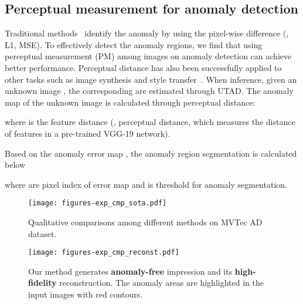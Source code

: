 \documentclass[final]{cvpr}
\newcommand{\proposed}{UTAD}
\begin{document}
\subsection{Perceptual measurement for anomaly detection} \label{sec:PM}

Traditional methods~\cite{A:akccay2019skip,A:schlegl2019fastAnnoGAN} identify the anomaly by using the pixel-wise difference (\eg, L1, MSE). 
To effectively detect the anomaly regions, we find that using perceptual measurement (PM) among images on anomaly detection can achieve better performance. Perceptual distance has also been successfully applied to other tasks such as image synthesis and style transfer~\cite{R:huang2018munit}. 
When inference, given an unknown image , the corresponding  are estimated through \proposed. 
The anomaly map  of the unknown image is calculated through perceptual distance:

where  is the feature distance (\ie, perceptual distance, which measures the  distance of features in a pre-trained VGG-19 network).  

Based on the anomaly error map , the anomaly region segmentation  is calculated below

where  are pixel index of error map  and  is threshold for anomaly segmentation.

\begin{figure*} [htbp]
	\begin{center}
		\texttt{[image: figures-exp\_cmp\_sota.pdf]} 
	\end{center}
	\vspace{-0.2cm}
	\caption{Qualitative comparisons among different methods on MVTec AD dataset.}
	\label{fig:cmp}
	\vspace{-0.2cm}
\end{figure*}

\begin{figure} [htbp]
	\begin{center}
		\texttt{[image: figures-exp\_cmp\_reconst.pdf]} 
	\end{center}
	\vspace{-0.2cm}
	\caption{Our method generates \textbf{anomaly-free} impression  and its \textbf{high-fidelity} reconstruction. The anomaly areas are highlighted in the input images with red contours.}
	\label{fig:cmp_recons}
	\vspace{-0.2cm}
\end{figure}
\end{document}
